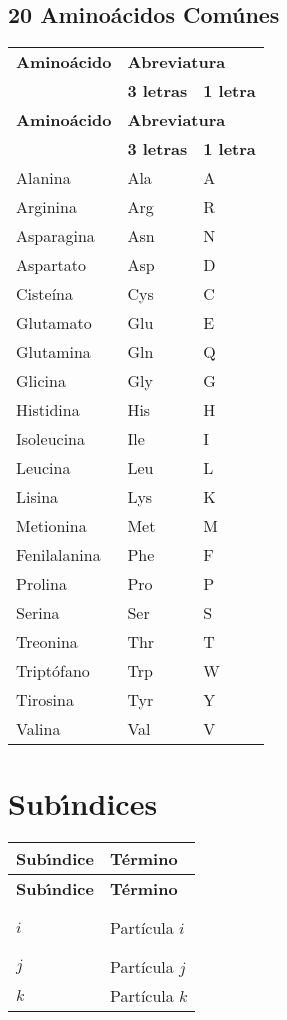 \subsection*{20 Amino\'{a}cidos Com\'{u}nes}
  \begin{longtable}[l]{lll}
   \textbf{Amino\'{a}cido} & \multicolumn{2}{l}{\textbf{Abreviatura}} \\
  \cline{2-3}
  &\textbf{3 letras}&\textbf{1 letra}\\[0.5ex] \hline%
  \endfirsthead%
 \textbf{Amino\'{a}cido} & \multicolumn{2}{l}{\textbf{Abreviatura}} \\
  \cline{2-3}
  &\textbf{3 letras}&\textbf{1 letra}\\[0.5ex] \hline%
 \endhead%
\renewcommand{\arraystretch}{1.4}\label{amino}
Alanina&Ala&A\\
Arginina&Arg&R\\
Asparagina&Asn&N\\
Aspartato&Asp&D\\
Ciste\'{i}na&Cys&C\\
Glutamato&Glu&E\\
Glutamina&Gln&Q\\
Glicina&Gly&G\\
Histidina&His&H\\
Isoleucina&Ile&I\\
Leucina&Leu&L\\
Lisina&Lys&K\\
Metionina&Met&M\\
Fenilalanina&Phe&F\\
Prolina&Pro&P\\
Serina&Ser&S\\
Treonina&Thr&T\\
Tript\'{o}fano&Trp&W\\
Tirosina&Tyr&Y\\
Valina&Val&V\\ \hline
\end{longtable}
\newpage
\section*{Sub\'{\i}ndices}
\begin{longtable}{ll}
  \textbf{Sub\'{\i}ndice} & \textbf{T\'{e}rmino} \\[0.5ex] \hline%
  \endfirsthead%
  \textbf{Sub\'{\i}ndice} & \textbf{T\'{e}rmino} \\[0.5ex] \hline%
  \endhead%
\renewcommand{\arraystretch}{1.4}\label{simbolosg}

 $i$&Part\'{i}cula $i$\\%
 $j$&Part\'{i}cula $j$\\%
 $k$&Part\'{i}cula $k$\\%


\end{longtable}
\setlength{\extrarowheight}{0pt}